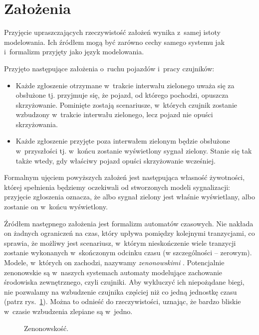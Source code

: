 \documentclass{pracamgr}
\newcommand{\imgr}[1]{rys.~\ref{#1}}
\theoremstyle{plain}
\begin{document}
\section{Założenia}
\label{s:models:assumptions}

Przyjęcie upraszczających rzeczywistość założeń wynika z~samej istoty
modelowania. Ich źródłem mogą być zarówno cechy samego systemu jak
i~formalizm przyjęty jako język modelowania.

Przyjęto następujące założenia o~ruchu pojazdów i~pracy czujników:
\begin{itemize}
  \item Każde zgłoszenie otrzymane w~trakcie interwału zielonego uważa
  się za obsłużone tj. przyjmuje się, że pojazd, od którego pochodzi,
  opuszcza skrzyżowanie. Pominięte zostają scenariusze, w~których
  czujnik zostanie wzbudzony w~trakcie interwału zielonego, lecz
  pojazd nie opuści skrzyżowania.
  \item Każde zgłoszenie przyjęte poza interwałem zielonym będzie
  obsłużone w~przyszłości tj. w~końcu zostanie wyświetlony sygnał
  zielony. Stanie się tak także wtedy, gdy właściwy pojazd opuści
  skrzyżowanie wcześniej. 
\end{itemize}
Formalnym ujęciem powyższych założeń jest następująca własność
żywotności, której spełnienia będziemy oczekiwali od stworzonych
modeli sygnalizacji: przyjęcie zgłoszenia oznacza, że albo sygnał
zielony jest właśnie wyświetlany, albo zostanie on w~końcu
wyświetlony.

Źródłem następnego założenia jest formalizm automatów czasowych. Nie
nakłada on żadnych ograniczeń na czas, który upływa pomiędzy kolejnymi
tranzycjami, co sprawia, że możliwy jest scenariusz, w~którym
nieskończenie wiele tranzycji zostanie wykonanych w~skończonym odcinku
czasu (w szczególności -- zerowym). Modele, w~których on zachodzi,
nazywamy \emph{zenonowskimi} \cite{henz-94}.  Potencjalnie zenonowskie
są w~naszych systemach automaty modelujące zachowanie środowiska
zewnętrznego, czyli czujniki. Aby wykluczyć ich niepożądane biegi, nie
pozwalamy na wzbudzenie czujnika częściej niż co jedną jednostkę czasu
(patrz \imgr{img:models-zeno}). Można to odnieść do rzeczywistości,
uznając, że bardzo bliskie w~czasie wzbudzenia zlepiane są w~jedno.

\begin{figure}
  \centering
  \hspace{1in}
  \caption{Zenonowskość.}
  \label{img:models-zeno}
\end{figure}
\end{document}
